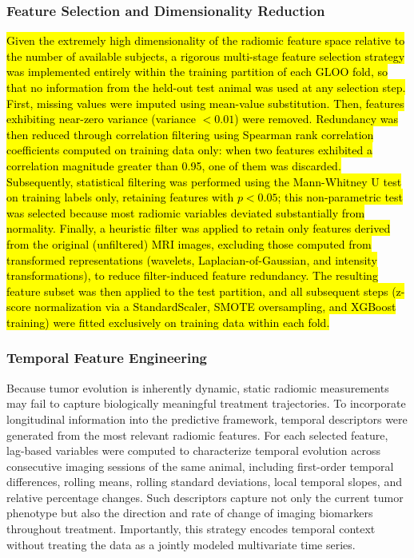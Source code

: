 \documentclass{article}
\begin{document}
\subsubsection{Feature Selection and Dimensionality Reduction}

\hl{Given the extremely high dimensionality of the radiomic feature space relative to the number of available subjects, a rigorous multi-stage feature selection strategy was implemented entirely within the training partition of each GLOO fold, so that no information from the held-out test animal was used at any selection step. First, missing values were imputed using mean-value substitution. Then, features exhibiting near-zero variance (variance $<0.01$) were removed. Redundancy was then reduced through correlation filtering using Spearman rank correlation coefficients computed on training data only: when two features exhibited a correlation magnitude greater than 0.95, one of them was discarded. Subsequently, statistical filtering was performed using the Mann-Whitney U test on training labels only, retaining features with $p < 0.05$; this non-parametric test was selected because most radiomic variables deviated substantially from normality. Finally, a heuristic filter was applied to retain only features derived from the original (unfiltered) MRI images, excluding those computed from transformed representations (wavelets, Laplacian-of-Gaussian, and intensity transformations), to reduce filter-induced feature redundancy. The resulting feature subset was then applied to the test partition, and all subsequent steps (z-score normalization via a StandardScaler, SMOTE oversampling, and XGBoost training) were fitted exclusively on training data within each fold.}

\subsubsection{Temporal Feature Engineering}

Because tumor evolution is inherently dynamic, static radiomic measurements may fail to capture biologically meaningful treatment trajectories. To incorporate longitudinal information into the predictive framework, temporal descriptors were generated from the most relevant radiomic features. For each selected feature, lag-based variables were computed to characterize temporal evolution across consecutive imaging sessions of the same animal, including first-order temporal differences, rolling means, rolling standard deviations, local temporal slopes, and relative percentage changes. Such descriptors capture not only the current tumor phenotype but also the direction and rate of change of imaging biomarkers throughout treatment. Importantly, this strategy encodes temporal context without treating the data as a jointly modeled multivariate time series.
\end{document}
